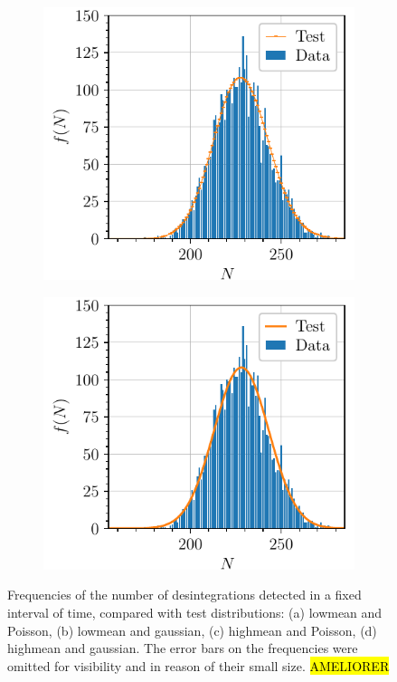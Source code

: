 \begin{figure}[htbp]
\begin{subfigure}{0.495\textwidth}
        \includegraphics[scale=1]{figures/highmean_poisson.pdf}
        \caption{}
    \end{subfigure}
    \hfill
    \begin{subfigure}{0.495\textwidth}
        \includegraphics[scale=1]{figures/highmean_gaussian.pdf}
        \caption{}
    \end{subfigure}
    \caption{Frequencies of the number of desintegrations detected 
    in a fixed interval of time, compared with test distributions: 
    (a) lowmean and Poisson, (b) lowmean and gaussian, 
    (c) highmean and Poisson, (d) highmean and gaussian.
    The error bars on the frequencies were omitted for visibility and in reason of their small size. \hl{AMELIORER}}
    \label{fig:statistical_tests}
\end{figure}

